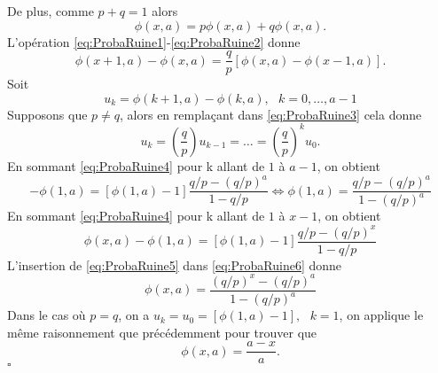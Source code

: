 \documentclass[8pt,notheorems]{beamer}
\theoremstyle{definition}
\theoremstyle{example}
\theoremstyle{mystyle}
\theoremstyle{plain}
\begin{document}
\begin{frame}[allowframebreaks]
De plus, comme $p+q=1$ alors
\begin{equation}\label{eq:ProbaRuine2}
\phi(x,a)= p\phi(x,a)+q\phi(x,a).
\end{equation}
L'opération \eqref{eq:ProbaRuine1}-\eqref{eq:ProbaRuine2} donne
\begin{equation}\label{eq:ProbaRuine3}
\phi(x+1,a)-\phi(x,a)= \frac{q}{p}\left[\phi(x,a)-\phi(x-1,a)\right].
\end{equation}
Soit
$$
u_k=\phi(k+1,a)-\phi(k,a),\text{ }k=0,\ldots, a-1
$$
Supposons que $p\neq q$, alors en remplaçant dans \eqref{eq:ProbaRuine3} cela donne
\begin{equation}\label{eq:ProbaRuine4}
u_k=\left(\frac{q}{p}\right)u_{k-1}=\ldots= \left(\frac{q}{p}\right)^{k}u_0.
\end{equation}
En sommant \eqref{eq:ProbaRuine4} pour k allant de $1$ à $a-1$, on obtient
\begin{equation}\label{eq:ProbaRuine5}
-\phi(1,a)=[\phi(1,a)-1]\frac{q/p-(q/p)^{a}}{1-q/p}\Leftrightarrow \phi(1,a)=\frac{q/p-(q/p)^{a}}{1-(q/p)^{a}}
\end{equation}
En sommant \eqref{eq:ProbaRuine4} pour k allant de $1$ à $x-1$, on obtient
\begin{equation}\label{eq:ProbaRuine6}
\phi(x,a)-\phi(1,a)=[\phi(1,a)-1]\frac{q/p-(q/p)^{x}}{1-q/p}
\end{equation}
L'insertion de \eqref{eq:ProbaRuine5} dans \eqref{eq:ProbaRuine6} donne
$$
\phi(x,a)=\frac{(q/p)^{x}-(q/p)^{a}}{1-(q/p)^{a}}
$$
Dans le cas où $p = q$, on a $u_k = u_0 =[\phi(1,a)-1],\text{ }k =1$, on applique le même raisonnement que précédemment pour trouver que 
$$
\phi(x,a) = \frac{a-x}{a}.
$$
$\square$\\
\end{frame}
\end{document}
